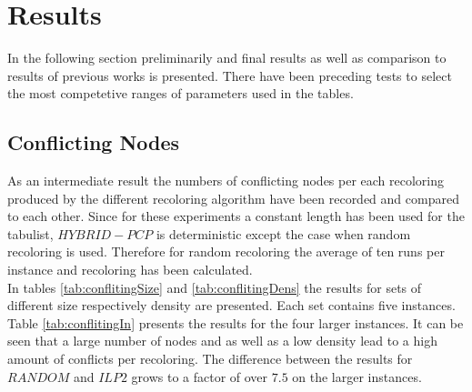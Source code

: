 \section{Results}
In the following section preliminarily and final results as well as comparison to results of previous works is presented. There have been preceding tests to select the most competetive ranges of parameters used in the tables.

\subsection{Conflicting Nodes}
As an intermediate result the numbers of conflicting nodes per each recoloring produced by the different recoloring algorithm have been recorded and compared to each other. Since for these experiments a constant length has been used for the tabulist, $HYBRID-PCP$ is deterministic except the case when random recoloring is used. Therefore for random recoloring the average of ten runs per instance and recoloring has been calculated.\\
In tables \ref{tab:conflitingSize} and \ref{tab:conflitingDens} the results for sets of different size respectively density are presented. Each set contains five instances. Table \ref{tab:conflitingIn} presents the results for the four larger instances. It can be seen that a large number of nodes and as well as a low density lead to a high amount of conflicts per recoloring. The difference between the results for $RANDOM$ and $ILP2$ grows to a factor of over $7.5$ on the larger instances.

\begin{table}[h]
\caption{Sets of different size containing five instances each. $cnodes/recoloring$ denotes the average amount of conflicting nodes per recoloring.}
\label{tab:conflitingSize}
\end{table}

